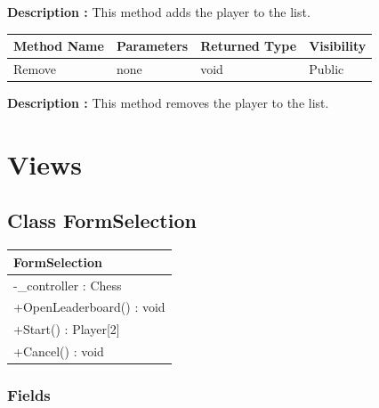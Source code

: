 \documentclass[12pt]{article}
\begin{document}
    \textbf{Description :} This method adds the player to the list.

    \begin{table}[H]
        \begin{tabular}{|l|l|l|l|}
            \hline
            \rowcolor[HTML]{EFEFEF}
            \cellcolor[HTML]{EFEFEF}\textbf{Method Name} & \textbf{Parameters} & \textbf{Returned Type} & \textbf{Visibility} \\ \hline
            Remove                                       & none                & void                   & Public              \\ \hline
        \end{tabular}
    \end{table}

    \textbf{Description :} This method removes the player to the list.

    \newpage



    \section{Views}


    \subsection{Class FormSelection}

    \begin{table}[H]
        \begin{tabular}{|l|}
            \hline
            \rowcolor[HTML]{C0C0C0}
            \textbf{FormSelection}    \\ \hline
            \rowcolor[HTML]{EFEFEF}
            -\_controller : Chess     \\ \hline
            \rowcolor[HTML]{FFFFFF}
            +OpenLeaderboard() : void \\ \hline
            \rowcolor[HTML]{FFFFFF}
            +Start() : Player{[}2{]}  \\ \hline
            \rowcolor[HTML]{FFFFFF}
            +Cancel() : void          \\ \hline
        \end{tabular}
    \end{table}

    \subsubsection{Fields}
\end{document}
